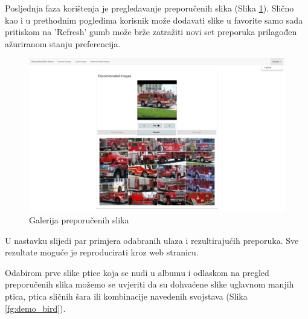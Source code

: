 \documentclass[times, utf8, proizvoljni, numeric]{fer}
\begin{document}
Posljednja faza korištenja je pregledavanje preporučenih slika (Slika \ref{fg:demo_recommended}). Slično kao i u prethodnim pogledima korisnik može dodavati slike u favorite samo sada pritiskom na 'Refresh' gumb može brže zatražiti novi set preporuka prilagođen ažuriranom stanju preferencija. 

\begin{figure}[H]
	\begin{center}
		\captionsetup{justification=centering}
		\includegraphics[width=1.0\textwidth]{./imgs/demo-preporucitelja-po-sadrzaju/tijek-rada/demo-reco.png}
		\caption{Galerija preporučenih slika}
		\label{fg:demo_recommended}
	\end{center}
\end{figure}


U nastavku slijedi par primjera odabranih ulaza i rezultirajućih preporuka. Sve rezultate moguće je reproducirati kroz web stranicu. 

Odabirom prve slike ptice koja se nudi u albumu i odlaskom na pregled preporučenih slika možemo se uvjeriti da su dohvaćene slike uglavnom manjih ptica, ptica sličnih šara ili kombinacije navedenih svojstava (Slika \ref{fg:demo_bird}). 
\end{document}
